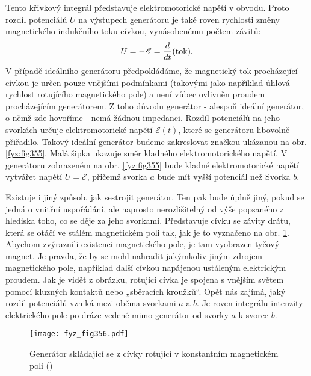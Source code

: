 {  Tento křivkový integrál představuje elektromotorické napětí v obvodu. Proto rozdíl potenciálů 
  \(U\) na výstupech generátoru je také roven rychlosti změny magnetického indukčního toku cívkou, 
  vynásobenému počtem závitů:
  \begin{equation}\label{fyz:eq479}
   U = -\mathscr{E} = \dfrac{d  }{d t}(\text{tok}).
  \end{equation}
  V případě ideálního generátoru předpokládáme, že magnetický tok procházející cívkou je určen 
  pouze vnějšími podmínkami (takovými jako například úhlová rychlost rotujícího magnetického pole) 
  a není vůbec ovlivněn proudem procházejícím generátorem. Z toho důvodu generátor - alespoň 
  ideální generátor, o němž zde hovoříme - nemá žádnou impedanci. Rozdíl potenciálů na jeho 
  svorkách určuje elektromotorické napětí \(\mathscr{E}(t)\), které se generátoru libovolně 
  přiřadilo. Takový ideální generátor budeme zakreslovat značkou ukázanou na obr. \ref{fyz:fig355}. 
  Malá šipka ukazuje směr kladného elektromotorického napětí. V generátoru zobrazeném na obr. 
  \ref{fyz:fig355} bude kladné elektromotorické napětí vytvářet napětí \(U=\mathscr{E}\), přičemž 
  svorka \(a\) bude mít vyšší potenciál než Svorka \(b\).
  
  Existuje i jiný způsob, jak sestrojit generátor. Ten pak bude úplně jiný, pokud se jedná o 
  vnitřní uspořádání, ale naprosto nerozlišitelný od výše popsaného z hlediska toho, co se děje za 
  jeho svorkami. Představuje cívku se závity drátu, která se otáčí ve stálém magnetickém poli tak, 
  jak je to vyznačeno na obr. \ref{fyz:fig356}. Abychom zvýraznili existenci magnetického pole, je 
  tam vyobrazen tyčový magnet. Je pravda, že by se mohl nahradit jakýmkoliv jiným zdrojem 
  magnetického pole, například další cívkou napájenou ustáleným elektrickým proudem. Jak je vidět z 
  obrázku, rotující cívka je spojena s vnějším světem pomocí kluzných kontaktů nebo „sběracích 
  kroužků“. Opět nás zajímá, jaký rozdíl potenciálů vzniká mezi oběma svorkami \(a\) a \(b\). Je 
  roven integrálu intenzity elektrického pole po dráze vedené mimo generátor od svorky \(a\) k 
  svorce \(b\).

  \begin{figure}[ht!] %
    \centering
    \texttt{[image: fyz\_fig356.pdf]}
    \caption{Generátor skládající se z cívky rotující v konstantním magnetickém poli
             (\cite[s.~397]{Feynman02})}
    \label{fyz:fig356}
  \end{figure}
  
}
